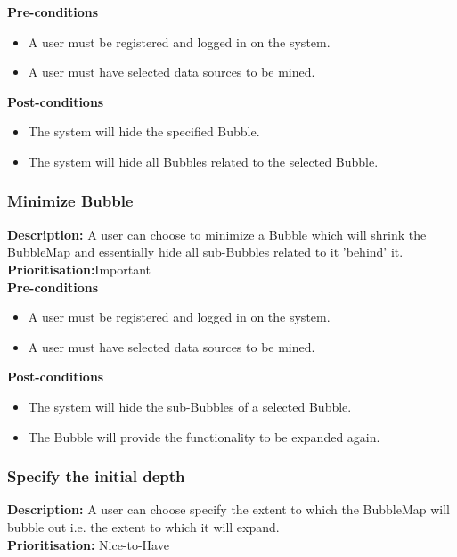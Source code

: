 \documentclass[hidelinks,english]{article}
\begin{document}
    
      \textbf{Pre-conditions}
    \begin{itemize}
        \item A user must be registered and logged in on the system.
        \item A user must have selected data sources to be mined.
    \end{itemize}
    
    \textbf{Post-conditions}
     \begin{itemize}
        \item The system will hide the specified Bubble.
        \item The system will hide all Bubbles related to the selected Bubble.
    \end{itemize}
    
    \subsubsection{Minimize Bubble}
	\textbf{Description:}  A user can choose to minimize a Bubble which will shrink the BubbleMap and essentially hide all sub-Bubbles related to it 'behind' it.
	\\
    \textbf{Prioritisation:}Important\\
    
    
      \textbf{Pre-conditions}
    \begin{itemize}
        \item A user must be registered and logged in on the system.
        \item A user must have selected data sources to be mined.
    \end{itemize}
    
    \textbf{Post-conditions}
     \begin{itemize}
        \item The system will hide the sub-Bubbles of a selected Bubble.
       \item The Bubble will provide the functionality to be expanded again.
    \end{itemize}
    
    \subsubsection{Specify the initial depth}
	\textbf{Description:}  A user can choose specify the extent to which the BubbleMap will bubble out i.e. the extent to which it will expand.
	\\
    \textbf{Prioritisation:} Nice-to-Have\\
    
\end{document}
